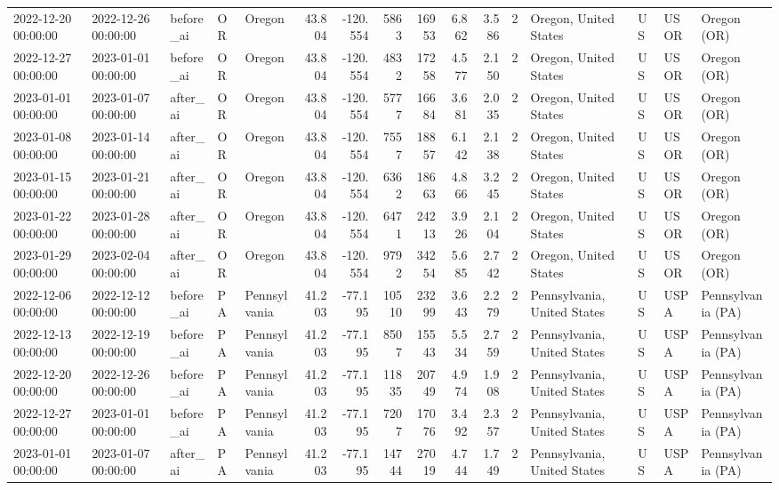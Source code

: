 \begin{tabular}{lllllrrrrrrlllll}
2022-12-20 00:00:00 & 2022-12-26 00:00:00 & before\_ai & OR & Oregon & 43.804 & -120.554 & 5863 & 16953 & 6.862 & 3.586 & 2 & Oregon, United States & US & USOR & Oregon (OR) \\
2022-12-27 00:00:00 & 2023-01-01 00:00:00 & before\_ai & OR & Oregon & 43.804 & -120.554 & 4832 & 17258 & 4.577 & 2.150 & 2 & Oregon, United States & US & USOR & Oregon (OR) \\
2023-01-01 00:00:00 & 2023-01-07 00:00:00 & after\_ai & OR & Oregon & 43.804 & -120.554 & 5777 & 16684 & 3.681 & 2.035 & 2 & Oregon, United States & US & USOR & Oregon (OR) \\
2023-01-08 00:00:00 & 2023-01-14 00:00:00 & after\_ai & OR & Oregon & 43.804 & -120.554 & 7557 & 18857 & 6.142 & 2.138 & 2 & Oregon, United States & US & USOR & Oregon (OR) \\
2023-01-15 00:00:00 & 2023-01-21 00:00:00 & after\_ai & OR & Oregon & 43.804 & -120.554 & 6362 & 18663 & 4.866 & 3.245 & 2 & Oregon, United States & US & USOR & Oregon (OR) \\
2023-01-22 00:00:00 & 2023-01-28 00:00:00 & after\_ai & OR & Oregon & 43.804 & -120.554 & 6471 & 24213 & 3.926 & 2.104 & 2 & Oregon, United States & US & USOR & Oregon (OR) \\
2023-01-29 00:00:00 & 2023-02-04 00:00:00 & after\_ai & OR & Oregon & 43.804 & -120.554 & 9792 & 34254 & 5.685 & 2.742 & 2 & Oregon, United States & US & USOR & Oregon (OR) \\
2022-12-06 00:00:00 & 2022-12-12 00:00:00 & before\_ai & PA & Pennsylvania & 41.203 & -77.195 & 10510 & 23299 & 3.643 & 2.279 & 2 & Pennsylvania, United States & US & USPA & Pennsylvania (PA) \\
2022-12-13 00:00:00 & 2022-12-19 00:00:00 & before\_ai & PA & Pennsylvania & 41.203 & -77.195 & 8507 & 15543 & 5.534 & 2.759 & 2 & Pennsylvania, United States & US & USPA & Pennsylvania (PA) \\
2022-12-20 00:00:00 & 2022-12-26 00:00:00 & before\_ai & PA & Pennsylvania & 41.203 & -77.195 & 11835 & 20749 & 4.974 & 1.908 & 2 & Pennsylvania, United States & US & USPA & Pennsylvania (PA) \\
2022-12-27 00:00:00 & 2023-01-01 00:00:00 & before\_ai & PA & Pennsylvania & 41.203 & -77.195 & 7207 & 17076 & 3.492 & 2.357 & 2 & Pennsylvania, United States & US & USPA & Pennsylvania (PA) \\
2023-01-01 00:00:00 & 2023-01-07 00:00:00 & after\_ai & PA & Pennsylvania & 41.203 & -77.195 & 14744 & 27019 & 4.744 & 1.749 & 2 & Pennsylvania, United States & US & USPA & Pennsylvania (PA) \\

\end{tabular}
